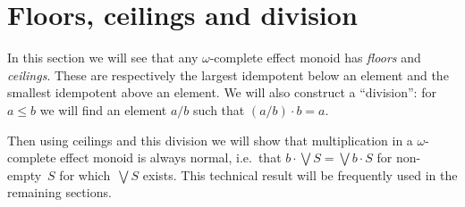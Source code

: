 \documentclass[10pt,conference]{IEEEtran}
\newcommand{\N}{\mathbb{N}}
\newcounter{counter}
\theoremstyle{definition}
\newtheorem{lemma}[counter]{Lemma}
\begin{document}




\section{Floors, ceilings and division}\label{sec:floorceiling}

In this section we will see that any $\omega$-complete effect monoid has
\emph{floors} and \emph{ceilings}. These are respectively the largest idempotent
below an element and the smallest idempotent above an element.
We will also construct a ``division'': for $a\leq b$ we will find 
an element $a/b$ such that $(a/b)\cdot b = a$. 

Then using ceilings and this division we will show that multiplication in a
$\omega$-complete effect monoid is always normal, i.e.~that 
$b\cdot \bigvee S = \bigvee b\cdot S$
for non-empty~$S$ for which~$\bigvee S$ exists. This technical result will be frequently used in the remaining sections.
\end{document}

